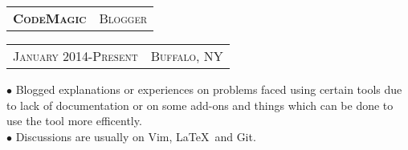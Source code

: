 \documentclass[10pt,a4paper,oneside]{article}
\begin{document}
    \vspace{-8pt}
    \begin{tabular}{c|c}
        \textbf{\normalsize C\textsc{ode}M\textsc{agic}}
        &\textmd{\normalsize B\textsc{logger}}
    \end{tabular}
    \hspace{3.83in}
    \textcolor{light-gray}{
        \begin{tabular}{c|c}
            {\small J\textsc{anuary 2014}-P\textsc{resent}}
            &{\small B\textsc{uffalo}, NY}
        \end{tabular}
    } 
    \vspace{-4mm}
    \begin{adjustwidth}{7pt}{0pt}
  {\footnotesize $\bullet$ Blogged explanations or experiences on problems faced using certain tools due to lack
            of documentation or on some add-ons and things which can be done to use the tool more efficently.}\\
            {\footnotesize $\bullet$ Discussions are usually on Vim, \LaTeX \  and Git. }
    \end{adjustwidth}
    \vspace{10pt}
    \begin{comment}
        \begin{tabular}{c}
        \textbf{\normalsize A\textsc{ffiliations}}\\
        \end{tabular}
        \begin{adjustwidth}{7pt}{0pt}
            {\footnotesize \textbf{International Society of Technical Education(09-12)} -Participated in several events and
            organised a few events.}\\
            {\footnotesize \textbf{Computer Society of India(09-12)} -Member since 2009,organised few workshops and
        tutorial sessions.}
            \vspace{0pt}\\
        \end{adjustwidth} 
    \end{comment}
\end{document}
